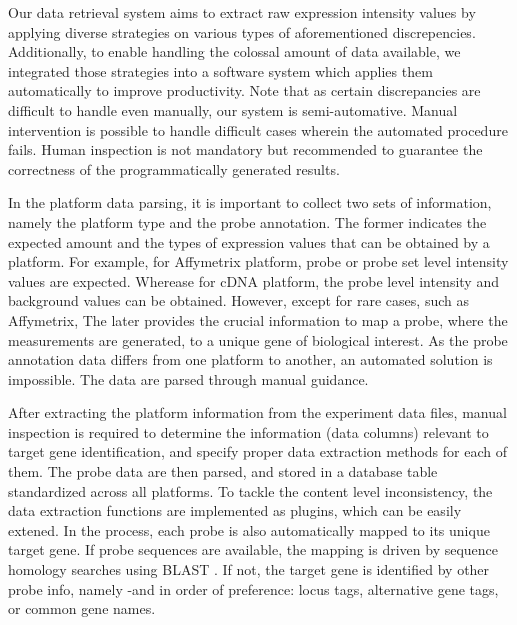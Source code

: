 Our data retrieval system aims to extract raw expression intensity values by
applying diverse strategies on various types of aforementioned discrepencies.
%
Additionally, to enable handling the colossal amount of data available, we
integrated those strategies into a software system which applies them
automatically to improve productivity.
%
Note that as certain discrepancies are difficult to handle even manually, our
system is semi-automative. Manual intervention is possible to handle difficult
cases wherein the automated procedure fails.  
%
Human inspection is not mandatory but recommended to guarantee the correctness
of the programmatically generated results.



In the platform data parsing, it is important to collect two sets of 
information, namely the platform type and the probe annotation. 
%
The former indicates the expected amount and the types of expression values
that can be obtained by a platform.  For example, for Affymetrix platform,
probe or probe set level intensity values are expected.  Wherease for cDNA
platform, the probe level intensity and background values can be obtained.
However, except for rare cases, such as Affymetrix, 
%
%
The later provides the crucial information to map a probe, where the
measurements are generated, to a unique gene of biological interest.
%
As the probe annotation data differs from one platform to another, an automated
solution is impossible.
%
The data are parsed through manual guidance.
%

%
After extracting the platform information from the experiment data files,
manual inspection is required to determine the information (data columns)
relevant to target gene identification, and specify proper data extraction
methods for each of them.
%
The probe data are then parsed, and stored in a database table standardized
across all platforms.
%
To tackle the content level inconsistency, the data extraction functions are
implemented as plugins, which can be easily extened.
%
In the process, each probe is also automatically mapped to its unique target
gene.
%
If probe sequences are available, the mapping is driven by sequence homology
searches using BLAST \cite{Altschul1997}.
%
If not, the target gene is identified by other probe info, namely -and in order
of preference: locus tags, alternative gene tags, or common gene names.





